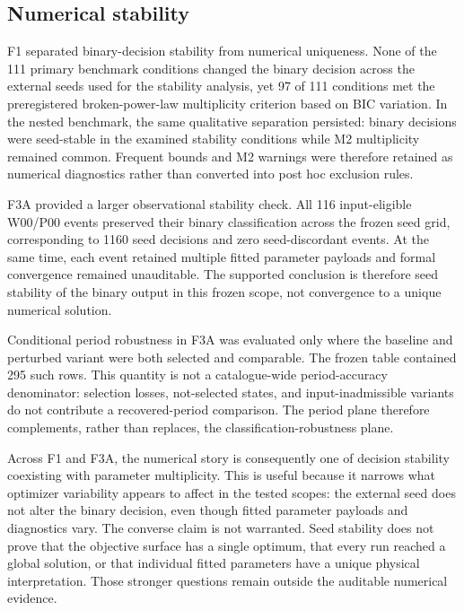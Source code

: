 \documentclass[11pt,a4paper]{article}
\begin{document}
\subsection{Numerical stability}
F1 separated binary-decision stability from numerical uniqueness. None of the 111 primary benchmark conditions changed the binary decision across the external seeds used for the stability analysis, yet 97 of 111 conditions met the preregistered broken-power-law multiplicity criterion based on BIC variation. In the nested benchmark, the same qualitative separation persisted: binary decisions were seed-stable in the examined stability conditions while M2 multiplicity remained common. Frequent bounds and M2 warnings were therefore retained as numerical diagnostics rather than converted into post hoc exclusion rules.

F3A provided a larger observational stability check. All 116 input-eligible W00/P00 events preserved their binary classification across the frozen seed grid, corresponding to 1160 seed decisions and zero seed-discordant events. At the same time, each event retained multiple fitted parameter payloads and formal convergence remained unauditable. The supported conclusion is therefore seed stability of the binary output in this frozen scope, not convergence to a unique numerical solution.

Conditional period robustness in F3A was evaluated only where the baseline and perturbed variant were both selected and comparable. The frozen table contained 295 such rows. This quantity is not a catalogue-wide period-accuracy denominator: selection losses, not-selected states, and input-inadmissible variants do not contribute a recovered-period comparison. The period plane therefore complements, rather than replaces, the classification-robustness plane.

Across F1 and F3A, the numerical story is consequently one of decision stability coexisting with parameter multiplicity. This is useful because it narrows what optimizer variability appears to affect in the tested scopes: the external seed does not alter the binary decision, even though fitted parameter payloads and diagnostics vary. The converse claim is not warranted. Seed stability does not prove that the objective surface has a single optimum, that every run reached a global solution, or that individual fitted parameters have a unique physical interpretation. Those stronger questions remain outside the auditable numerical evidence.
\end{document}

